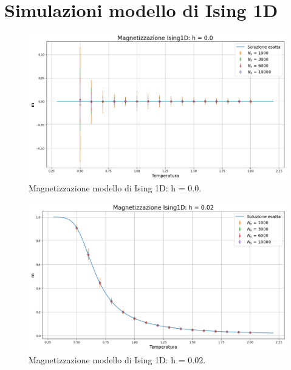 \section{Simulazioni modello di Ising 1D}

\begin{figure}[H]
    \centering
    \includegraphics[width=\textwidth]{Immagini/simIsing1D/magn_h0.0.png}
    \caption{Magnetizzazione modello di Ising 1D: h = 0.0.}
    \label{fig: magn_Ising1D_h0.0}
\end{figure}

\begin{figure}[H]
    \centering
    \includegraphics[width=\textwidth]{Immagini/simIsing1D/magn_h0.02.png}
    \caption{Magnetizzazione modello di Ising 1D: h = 0.02.}
    \label{fig: magn_Ising1D_h0.02}
\end{figure}

